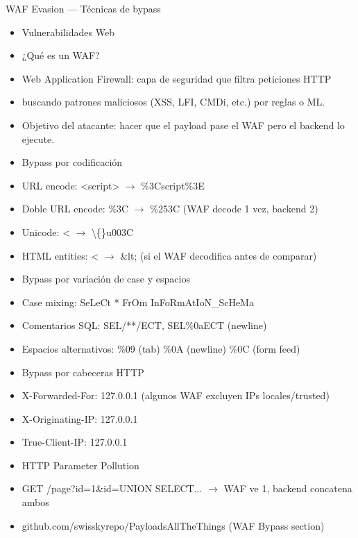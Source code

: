 \documentclass[aspectratio=169,10pt]{beamer}
\begin{document}
\begin{frame}[allowframebreaks]{WAF Evasion --- Técnicas de bypass}
\small
  \begin{itemize}
  \item Vulnerabilidades Web
  \item ¿Qué es un WAF?
  \item Web Application Firewall: capa de seguridad que filtra peticiones HTTP
  \item buscando patrones maliciosos (XSS, LFI, CMDi, etc.) por reglas o ML.
  \item Objetivo del atacante: hacer que el payload pase el WAF pero el backend lo ejecute.
  \item Bypass por codificación
  \item URL encode: \textless{}script\textgreater{} $\rightarrow$ \%3Cscript\%3E
  \item Doble URL encode: \%3C $\rightarrow$ \%253C (WAF decode 1 vez, backend 2)
  \item Unicode: \textless{} $\rightarrow$ \textbackslash\{\}u003C
  \item HTML entities: \textless{} $\rightarrow$ \&lt; (si el WAF decodifica antes de comparar)
  \item Bypass por variación de case y espacios
  \item Case mixing: SeLeCt * FrOm InFoRmAtIoN\_ScHeMa
  \item Comentarios SQL: SEL/**/ECT, SEL\%0aECT (newline)
  \item Espacios alternativos: \%09 (tab) \%0A (newline) \%0C (form feed)
  \item Bypass por cabeceras HTTP
  \item X-Forwarded-For: 127.0.0.1 (algunos WAF excluyen IPs locales/trusted)
  \item X-Originating-IP: 127.0.0.1
  \item True-Client-IP: 127.0.0.1
  \item HTTP Parameter Pollution
  \item GET /page?id=1\&id=UNION SELECT... $\rightarrow$ WAF ve 1, backend concatena ambos
  \item github.com/swisskyrepo/PayloadsAllTheThings (WAF Bypass section)
  \end{itemize}
\end{frame}
\end{document}
